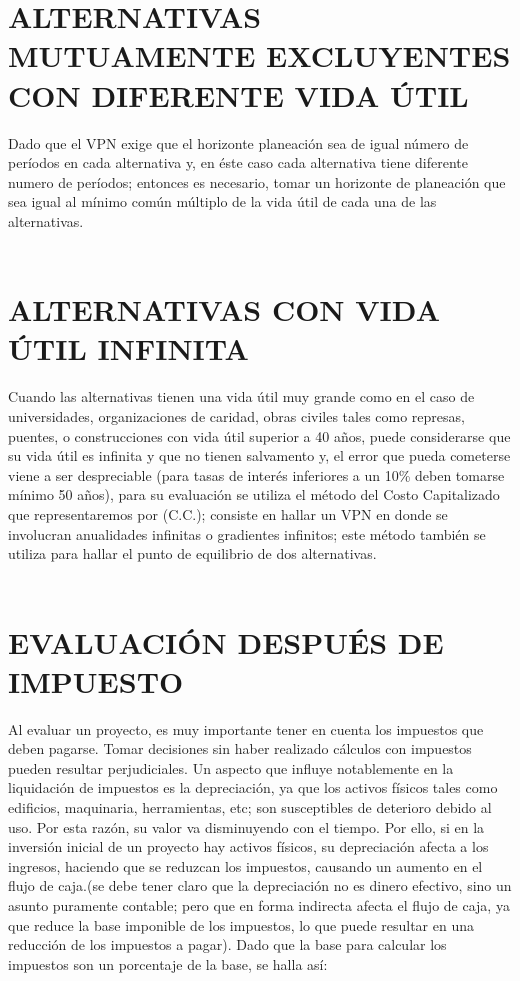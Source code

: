 \section{ALTERNATIVAS MUTUAMENTE EXCLUYENTES CON DIFERENTE VIDA ÚTIL}

Dado que el VPN exige que el horizonte planeación sea de igual número de períodos en cada alternativa y, en éste caso cada alternativa tiene diferente numero de períodos; entonces es necesario, tomar un horizonte de planeación que sea igual al mínimo común múltiplo de la vida útil de cada una de las alternativas.\\
\\


\section{ALTERNATIVAS CON VIDA ÚTIL INFINITA}

Cuando las alternativas tienen una vida útil muy grande como en el caso de universidades, organizaciones de caridad, obras civiles tales como represas, puentes, o construcciones con vida útil superior a 40 años, puede considerarse que su vida útil es infinita y que no tienen salvamento y, el error que pueda cometerse viene a ser despreciable (para tasas de interés inferiores a un 10\% deben tomarse mínimo 50 años), para su evaluación se utiliza el método del Costo Capitalizado que representaremos por (C.C.); consiste en hallar un VPN en donde se involucran anualidades infinitas o gradientes infinitos; este método también se utiliza para hallar el punto de equilibrio de dos alternativas.\\
\\


\section{EVALUACIÓN DESPUÉS DE IMPUESTO}

Al evaluar un proyecto, es muy importante tener en cuenta los impuestos que deben pagarse. Tomar decisiones sin haber realizado cálculos con impuestos pueden resultar perjudiciales.
Un aspecto que influye notablemente en la liquidación de impuestos es la depreciación, ya que los activos físicos tales como edificios, maquinaria, herramientas, etc; son susceptibles de deterioro debido al uso. Por esta razón, su valor va disminuyendo con el tiempo. Por ello, si en la inversión inicial de un proyecto hay activos físicos, su depreciación afecta a los ingresos, haciendo que se reduzcan los impuestos, causando un aumento en el flujo de caja.(se debe tener claro que la depreciación no es dinero efectivo, sino un asunto puramente contable; pero que en forma indirecta afecta el flujo de caja, ya que reduce la base imponible de los impuestos, lo que puede resultar en una reducción de los impuestos a pagar). Dado que la base para calcular los impuestos son un porcentaje de la base, se halla así:\\

